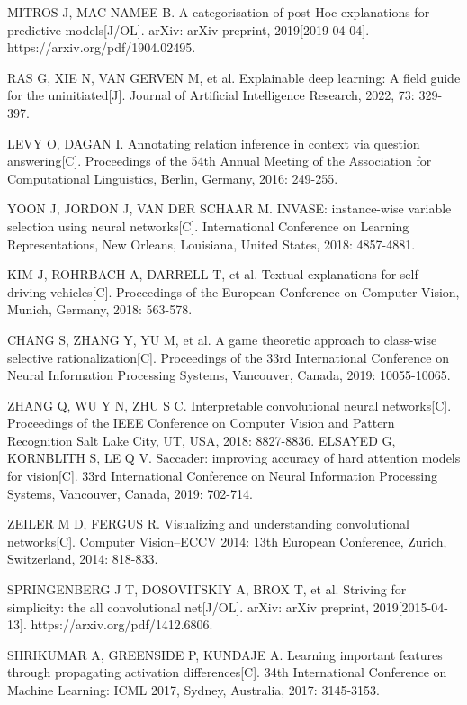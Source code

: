 \begin{thebibliography}{200}
MITROS J, MAC NAMEE B. A categorisation of post-Hoc explanations for predictive models[J/OL]. arXiv: arXiv preprint, 2019[2019-04-04]. https://arxiv.org/pdf/1904.02495.

RAS G, XIE N, VAN GERVEN M, et al. Explainable deep learning: A field guide for the uninitiated[J]. Journal of Artificial Intelligence Research, 2022, 73: 329-397.

LEVY O, DAGAN I. Annotating relation inference in context via question answering[C]. Proceedings of the 54th Annual Meeting of the Association for Computational Linguistics, Berlin, Germany, 2016: 249-255.

YOON J, JORDON J, VAN DER SCHAAR M. INVASE: instance-wise variable selection using neural networks[C]. International Conference on Learning Representations, New Orleans, Louisiana, United States, 2018: 4857-4881.

KIM J, ROHRBACH A, DARRELL T, et al. Textual explanations for self-driving vehicles[C]. Proceedings of the European Conference on Computer Vision, Munich, Germany, 2018: 563-578.

CHANG S, ZHANG Y, YU M, et al. A game theoretic approach to class-wise selective rationalization[C]. Proceedings of the 33rd International Conference on Neural Information Processing Systems, Vancouver, Canada, 2019: 10055-10065.

ZHANG Q, WU Y N, ZHU S C. Interpretable convolutional neural networks[C]. Proceedings of the IEEE Conference on Computer Vision and Pattern Recognition Salt Lake City, UT, USA, 2018: 8827-8836.
ELSAYED G, KORNBLITH S, LE Q V. Saccader: improving accuracy of hard attention models for vision[C]. 33rd International Conference on Neural Information Processing Systems, Vancouver, Canada, 2019: 702-714.

ZEILER M D, FERGUS R. Visualizing and understanding convolutional networks[C]. Computer Vision–ECCV 2014: 13th European Conference, Zurich, Switzerland, 2014: 818-833.

SPRINGENBERG J T, DOSOVITSKIY A, BROX T, et al. Striving for simplicity: the all convolutional net[J/OL]. arXiv: arXiv preprint, 2019[2015-04-13]. https://arxiv.org/pdf/1412.6806.

SHRIKUMAR A, GREENSIDE P, KUNDAJE A. Learning important features through propagating activation differences[C]. 34th International Conference on Machine Learning: ICML 2017, Sydney, Australia, 2017: 3145-3153.


\end{thebibliography}
